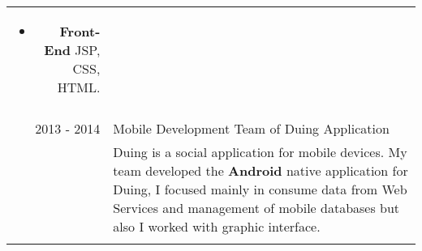 \documentclass[a4paper,10pt]{article} %
\begin{document}
\begin{tabular}{r|p{11cm}}
{\begin{enumerate}
\begin{itemize}
\item \textbf{Front-End} JSP, CSS, HTML.
\end{itemize}
\end{enumerate}} \\
\multicolumn{2}{c}{} \\
\textsc{2013 - 2014} & Mobile Development Team of Duing Application\\
& \footnotesize{Duing is a social application for mobile devices.
My team developed the \textbf{Android} native application for Duing, I focused mainly in consume data from Web Services and management of mobile databases but also I worked with graphic interface.}\\
\multicolumn{2}{c}{} \\
\end{tabular}



\end{document}
